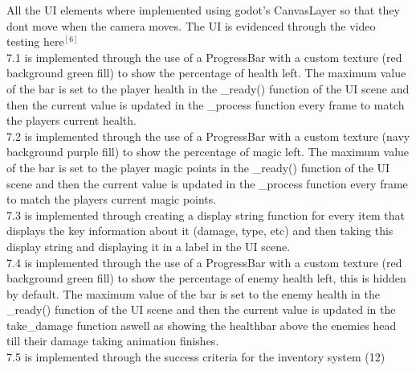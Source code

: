 \documentclass{article}
\begin{document}
        All the UI elements where implemented using godot's CanvasLayer so that they dont move when the camera moves. The UI is evidenced through the video testing here$^{[6]}$\\
        7.1 is implemented through the use of a ProgressBar with a custom texture (red background green fill) to show the percentage of health left. The maximum value of the bar is set to the player health in the \_ready() function of the UI scene and then the current value is updated in the \_process function every frame to match the players current health.\\
        7.2 is implemented through the use of a ProgressBar with a custom texture (navy background purple fill) to show the percentage of magic left. The maximum value of the bar is set to the player magic points in the \_ready() function of the UI scene and then the current value is updated in the \_process function every frame to match the players current magic points.\\
        7.3 is implemented through creating a display string function for every item that displays the key information about it (damage, type, etc) and then taking this display string and displaying it in a label in the UI scene.\\
        7.4 is implemented through the use of a ProgressBar with a custom texture (red background green fill) to show the percentage of enemy health left, this is hidden by default. The maximum value of the bar is set to the enemy health in the \_ready() function of the UI scene and then the current value is updated in the take\_damage function aswell as showing the healthbar above the enemies head till their damage taking animation finishes.\\
        7.5 is implemented through the success criteria for the inventory system (12)\\
\end{document}
